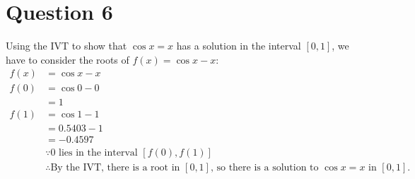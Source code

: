\documentclass{article}
\begin{document}
\section*{Question 6}
Using the IVT to show that $\cos x=x$ has a solution in the interval $[0,1]$, we have to consider the roots of $f(x)=\cos x - x$:
\begin{align*}
    f(x) & = \cos x - x                                                                                                             \\
    f(0) & = \cos 0 - 0                                                                                                             \\
         & = 1                                                                                                                      \\
    f(1) & = \cos 1 - 1                                                                                                             \\
         & = 0.5403 - 1                                                                                                             \\
         & = -0.4597                                                                                                                \\
         & \because \text{0 lies in the interval } [f(0), f(1)]                                                                     \\
         & \therefore \text{By the IVT, there is a root in } [0,1]\text{, so there is a solution to } \cos x = x \text{ in } [0,1].
\end{align*}
\end{document}
